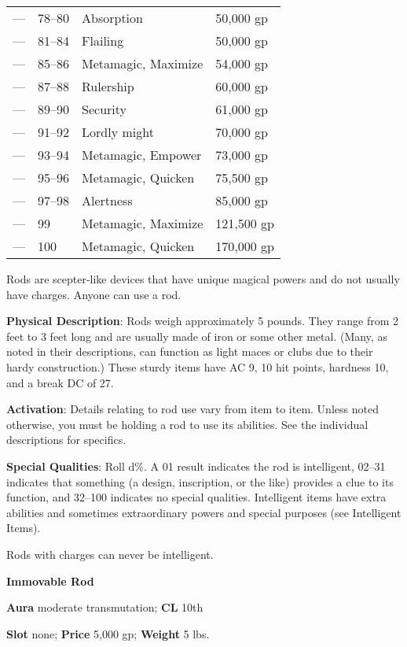 \begin{table}[]
\begin{tabular}{llll}
 — & 78–80 & Absorption & 50,000 gp \\
 — & 81–84 & Flailing & 50,000 gp \\
 — & 85–86 & Metamagic, Maximize & 54,000 gp \\
 — & 87–88 & Rulership & 60,000 gp \\
 — & 89–90 & Security & 61,000 gp \\
 — & 91–92 & Lordly might & 70,000 gp \\
 — & 93–94 & Metamagic, Empower & 73,000 gp \\
 — & 95–96 & Metamagic, Quicken & 75,500 gp \\
 — & 97–98 & Alertness & 85,000 gp \\
 — & 99 & Metamagic, Maximize & 121,500 gp \\
 — & 100 & Metamagic, Quicken & 170,000 gp\\
\end{tabular}
\end{table}
				
Rods are scepter-like devices that have unique magical powers and do not usually have charges. Anyone can use a rod.
				
\textbf{Physical Description}: Rods weigh approximately 5 pounds. They range from 2 feet to 3 feet long and are usually made of iron or some other metal. (Many, as noted in their descriptions, can function as light maces or clubs due to their hardy construction.) These sturdy items have AC 9, 10 hit points, hardness 10, and a break DC of 27.
				
\textbf{Activation}: Details relating to rod use vary from item to item. Unless noted otherwise, you must be holding a rod to use its abilities. See the individual descriptions for specifics.
				
\textbf{Special Qualities}: Roll d\%. A 01 result indicates the rod is intelligent, 02--31 indicates that something (a design, inscription, or the like) provides a clue to its function, and 32--100 indicates no special qualities. Intelligent items have extra abilities and sometimes extraordinary powers and special purposes (see Intelligent Items).
				
Rods with charges can never be intelligent.
				
\textbf{Immovable Rod}
				
\textbf{Aura} moderate transmutation;\textbf{ CL }10th
				
\textbf{Slot} none; \textbf{Price} 5,000 gp; \textbf{Weight} 5 lbs.
				
